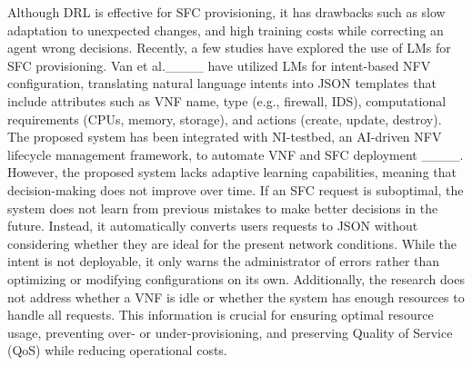 Although DRL is effective for SFC provisioning, it has drawbacks such as  slow adaptation to unexpected changes, and high training costs while correcting an agent wrong decisions. Recently, a few studies have explored the use of LMs for SFC provisioning.
Van et al.____ have utilized LMs for intent-based NFV configuration, translating natural language intents into JSON templates that include attributes such as VNF name, type (e.g., firewall, IDS), computational requirements (CPUs, memory, storage), and actions (create, update, destroy). The proposed system has been integrated with NI-testbed, an AI-driven NFV lifecycle management framework, to automate VNF and SFC deployment ____. However, the proposed system lacks adaptive learning capabilities, meaning that decision-making does not improve over time. If an SFC request is suboptimal, the system does not learn from previous mistakes to make better decisions in the future. Instead, it automatically converts users requests to JSON without considering whether they are ideal for the present network conditions. While the intent is not deployable, it only warns the administrator of errors rather than optimizing or modifying configurations on its own.
Additionally, the research does not address whether a VNF is idle or  whether the system has enough resources to handle all requests. This information is crucial for ensuring optimal resource usage, preventing over- or under-provisioning, and preserving Quality of Service (QoS) while reducing operational costs. 




